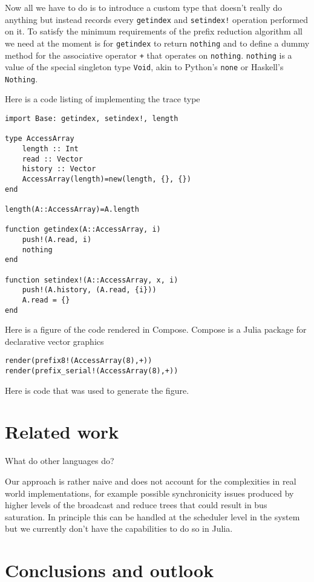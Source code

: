 \documentclass{sig-alternate}
\newcommand{\code}[1]{\texttt{#1}}
\begin{document}
Now all we have to do is to introduce a custom type that doesn't really do anything but instead records every \code{getindex} and \code{setindex!} operation performed on it. To satisfy the minimum requirements of the prefix reduction algorithm all we need at the moment is for \code{getindex} to return \code{nothing} and to define a dummy method for the associative operator \code{+} that operates on \code{nothing}. \code{nothing} is a value of the special singleton type \code{Void}, akin to Python's \code{none} or Haskell's \code{Nothing}.

Here is a code listing of implementing the trace type

\begin{verbatim}
import Base: getindex, setindex!, length

type AccessArray
    length :: Int
    read :: Vector
    history :: Vector
    AccessArray(length)=new(length, {}, {})
end

length(A::AccessArray)=A.length

function getindex(A::AccessArray, i)
    push!(A.read, i)
    nothing
end

function setindex!(A::AccessArray, x, i)
    push!(A.history, (A.read, {i}))
    A.read = {}
end
\end{verbatim}

Here is a figure of the code rendered in Compose. Compose is a Julia package for declarative vector graphics 

\begin{verbatim}
render(prefix8!(AccessArray(8),+))
render(prefix_serial!(AccessArray(8),+))
\end{verbatim}

Here is code that was used to generate the figure.

\section{Related work}

What do other languages do?

Our approach is rather naive and does not account for the complexities in real world implementations, for example possible synchronicity issues produced by higher levels of the broadcast and reduce trees that could result in bus saturation. In principle this can be handled at the scheduler level in the system but we currently don't have the capabilities to do so in Julia.

\section{Conclusions and outlook}
\end{document}
